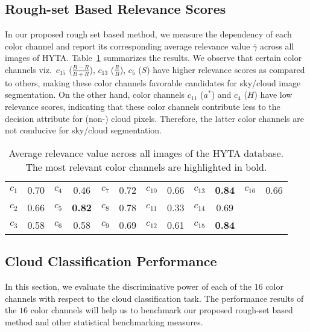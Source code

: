 \subsection{Rough-set Based Relevance Scores}

In our proposed rough set based method, we measure the dependency of each color channel and report its corresponding average relevance value $\overline{\gamma}$ across all images of HYTA. Table~\ref{tab:rel-val} summarizes the results. We observe that certain color channels viz.\ $c_{15}$ ($\frac{B-R}{B+R}$), $c_{13}$ ($\frac{R}{B}$), $c_5$ ($S$) have higher relevance scores as compared to others, making these color channels  favorable candidates for sky/cloud image segmentation.
On the other hand, color channels $c_{11}$ ($a^{*}$) and $c_4$ ($H$) have low relevance scores, indicating that these color channels contribute less to the decision attribute for (non-) cloud pixels. Therefore, the latter color channels are not conducive for sky/cloud segmentation. 

\begin{table}[htbp]
\normalsize
\centering
\begin{tabular}{ r | c || c | c || c | c || c | c|| c | c ||c | l }
\hline
$c_{1}$ & 0.70 & $c_{4}$ & 0.46 & $c_{7}$ & 0.72 & $c_{10}$ & 0.66 & $c_{13}$ & \textbf{0.84} & $c_{16}$ & 0.66\\
$c_{2}$ & 0.66 & $c_{5}$ & \textbf{0.82} & $c_{8}$ & 0.78 & $c_{11}$ & 0.33 & $c_{14}$ & 0.69 & $ $ & $ $\\
$c_{3}$ & 0.58 & $c_{6}$ & 0.58 & $c_{9}$ & 0.69 & $c_{12}$ & 0.61 & $c_{15}$ & \textbf{0.84} & $ $ & $ $\\
\hline
\end{tabular}
\caption[Average relevance value across all images of the HYTA database.]{Average relevance value across all images of the HYTA database. The most relevant color channels are highlighted in bold.}
\label{tab:rel-val}
\end{table}

\subsection{Cloud Classification Performance}
In this section, we evaluate the discriminative power of each of the $16$ color channels with respect to the cloud classification task. The performance results of the $16$ color channels will help us to benchmark our proposed rough-set based method and other statistical benchmarking measures.

